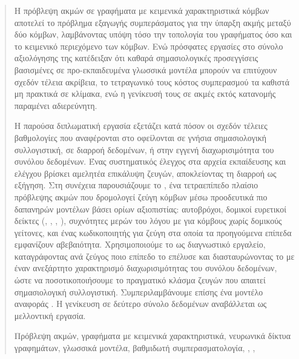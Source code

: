 \begin{abstract}
    Η πρόβλεψη ακμών σε γραφήματα με κειμενικά χαρακτηριστικά κόμβων αποτελεί το πρόβλημα
    εξαγωγής συμπεράσματος για την ύπαρξη ακμής μεταξύ δύο κόμβων, λαμβάνοντας υπόψη
    τόσο την τοπολογία του γραφήματος όσο και το κειμενικό περιεχόμενο των κόμβων.
    Ενώ
    πρόσφατες εργασίες στο σύνολο αξιολόγησης  της  κατέδειξαν
    ότι καθαρά σημασιολογικές προσεγγίσεις βασισμένες σε προ-εκπαιδευμένα γλωσσικά
    μοντέλα μπορούν να επιτύχουν σχεδόν τέλεια ακρίβεια, το τετραγωνικό τους κόστος
    συμπερασμού τα καθιστά μη πρακτικά σε κλίμακα, ενώ η γενίκευσή τους σε ακμές εκτός
    κατανομής παραμένει αδιερεύνητη.

    Η παρούσα διπλωματική εργασία εξετάζει κατά πόσον οι σχεδόν τέλειες βαθμολογίες
    που αναφέρονται στο  οφείλονται σε γνήσια σημασιολογική
    συλλογιστική, σε διαρροή δεδομένων, ή στην εγγενή διαχωρισιμότητα του συνόλου
    δεδομένων.
    Ένας συστηματικός έλεγχος  στα αρχεία εκπαίδευσης και ελέγχου
    βρίσκει αμελητέα επικάλυψη ζευγών, αποκλείοντας τη διαρροή ως εξήγηση.
    Στη
    συνέχεια παρουσιάζουμε το \textbf{}, ένα τετραεπίπεδο πλαίσιο πρόβλεψης
    ακμών που δρομολογεί ζεύγη κόμβων μέσω προοδευτικά πιο δαπανηρών μοντέλων βάσει
    ορίων αξιοπιστίας: αυτοβρόχοι, δομικοί ευρετικοί δείκτες
    (, , , ), συχνότητες μερών του λόγου με  για κόμβους χωρίς
    δομικούς γείτονες, και ένας κωδικοποιητής  για ζεύγη
    στα οποία τα προηγούμενα επίπεδα εμφανίζουν αβεβαιότητα.
    Χρησιμοποιούμε το
     ως διαγνωστικό εργαλείο, καταγράφοντας ανά ζεύγος ποιο επίπεδο
    το επέλυσε και διασταυρώνοντας το με έναν ανεξάρτητο χαρακτηρισμό
    διαχωρισιμότητας του συνόλου δεδομένων, ώστε να ποσοτικοποιήσουμε το πραγματικό
    κλάσμα ζευγών που απαιτεί σημασιολογική συλλογιστική.
    Συμπεριλαμβάνουμε επίσης
    ένα μοντέλο αναφοράς .
    Η γενίκευση σε δεύτερο σύνολο δεδομένων
    αναβάλλεται ως μελλοντική εργασία.

    \begin{keywords}
        Πρόβλεψη ακμών, γραφήματα με κειμενικά χαρακτηριστικά, νευρωνικά δίκτυα γραφημάτων,
        γλωσσικά μοντέλα, βαθμιδωτή συμπερασματολογία, ,
        , 
    \end{keywords}
\end{abstract}

